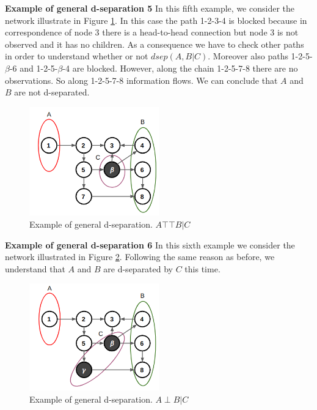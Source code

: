 \textbf{Example of general d-separation 5}
\newline
In this fifth example, we consider the network illustrate in Figure \ref{fig:exampleDSeparation5}.
In this case the path 1-2-3-4 is blocked because in correspondence of node 3
there is a head-to-head connection but node 3 is not observed and it has no
children. As a consequence we have to check other paths in order to understand whether
or not $\mathit{dsep}(A,B|C)$. Moreover also paths 1-2-5-$\beta$-6 and 1-2-5-$\beta$-4
are blocked. However, along the chain 1-2-5-7-8 there are no observations. So along
1-2-5-7-8 information flows. We can conclude that $A$ and $B$ are not d-separated.
\newline

\begin{figure}[H]
	\centering
	\includegraphics[width=0.5\textwidth]{
		images/08_BayesianNetworks_exampleGeneralDSeparation4.png
	}
	\caption{Example of general d-separation. $A \top\!\!\!\!\top B | C$ }
	\label{fig:exampleDSeparation5}
\end{figure}

\textbf{Example of general d-separation 6}
\newline
In this sixth example we consider the network illustrated in Figure
\ref{fig:exampleDSeparation6}. Following the same reason as before, we
understand that $A$ and $B$ are d-separated by $C$ this time.

\begin{figure}[H]
	\centering
	\includegraphics[width=0.5\textwidth]{
		images/08_BayesianNetworks_exampleGeneralDSeparation5.png
	}
	\caption{Example of general d-separation. $A \perp B | C$ }
	\label{fig:exampleDSeparation6}
\end{figure}

